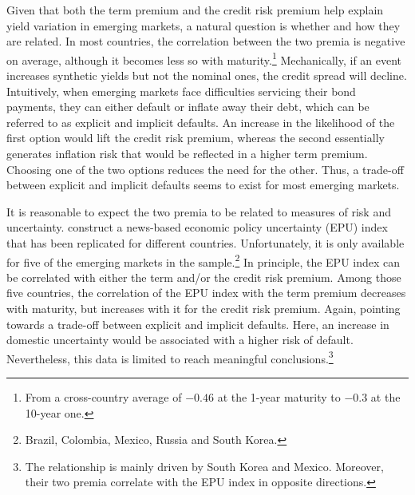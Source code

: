 {%
Given that both the term premium and the credit risk premium help explain yield variation in emerging markets, a natural question is whether and how they are related.
In most countries, the correlation between the two premia is negative on average, although it becomes less so with maturity.\footnote{ From a cross-country average of \(-0.46\) at the 1-year maturity to \(-0.3\) at the 10-year one.}
Mechanically, if an event increases synthetic yields but not the nominal ones, the credit spread will decline.
Intuitively, when emerging markets face difficulties servicing their bond payments, they can either default or inflate away their debt, which can be referred to as explicit and implicit defaults. %
An increase in the likelihood of the first option would lift the credit risk premium, whereas the second essentially generates inflation risk that would be reflected in a higher term premium.
Choosing one of the two options reduces the need for the other.
Thus, a trade-off between explicit and implicit defaults seems to exist for most emerging markets.

It is reasonable to expect the two premia to be related to measures of risk and uncertainty.
\citet*{BakerBloomDavis:2016} construct a news-based economic policy uncertainty (EPU) index that has been replicated for different countries. 
Unfortunately, it is only available for five of the emerging markets in the sample.\footnote{ Brazil, Colombia, Mexico, Russia and South Korea.}
In principle, the EPU index can be correlated with either the term and/or the credit risk premium.
Among those five countries, the correlation of the EPU index with the term premium decreases with maturity, but increases with it for the credit risk premium.
Again, pointing towards a trade-off between explicit and implicit defaults.
Here, an increase in domestic uncertainty would be associated with a higher risk of default.
Nevertheless, this data is limited to reach meaningful conclusions.\footnote{ The relationship is mainly driven by South Korea and Mexico. Moreover, their two premia correlate with the EPU index in opposite directions.}

}

